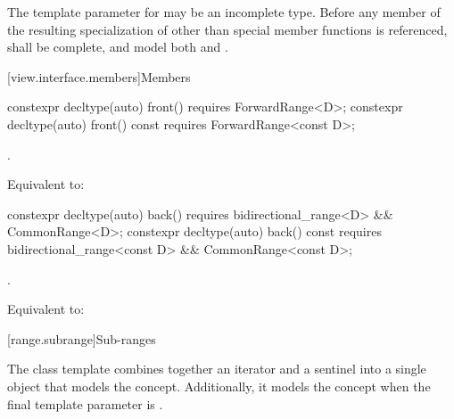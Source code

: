 \pnum
The template parameter  for  may be an
incomplete type. Before any member of the resulting specialization of
 other than special member functions
is referenced,  shall be complete, and
model both  and .

[view.interface.members]{Members}

%
\begin{itemdecl}
constexpr decltype(auto) front() requires ForwardRange<D>;
constexpr decltype(auto) front() const requires ForwardRange<const D>;
\end{itemdecl}

\begin{itemdescr}
\pnum
\expects {}.

\pnum
\effects Equivalent to: 
\end{itemdescr}

%
\begin{itemdecl}
constexpr decltype(auto) back() requires bidirectional_range<D> && CommonRange<D>;
constexpr decltype(auto) back() const
  requires bidirectional_range<const D> && CommonRange<const D>;
\end{itemdecl}

\begin{itemdescr}
\pnum
\expects {}.

\pnum
\effects Equivalent to: 
\end{itemdescr}

[range.subrange]{Sub-ranges}

\pnum
The  class template combines together an
iterator and a sentinel into a single object that models the
 concept. Additionally, it models the
 concept when the final template parameter is
.


